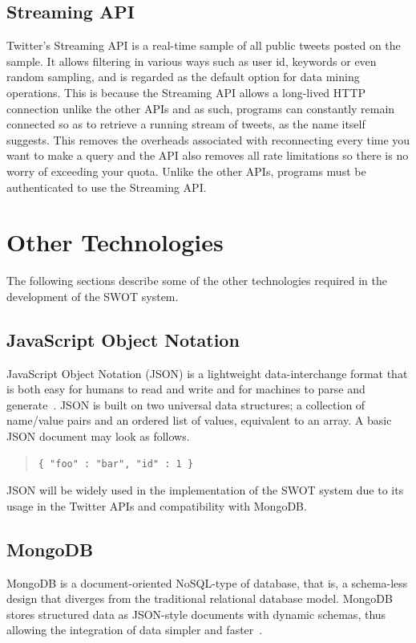 \subsection{Streaming API}
Twitter's Streaming API is a real-time sample of all public tweets posted on the sample. It allows filtering in various ways such as user id, keywords or even random sampling, and is regarded as the default option for data mining operations. This is because the Streaming API allows a long-lived HTTP connection unlike the other APIs and as such, programs can constantly remain connected so as to retrieve a running stream of tweets, as the name itself suggests. This removes the overheads associated with reconnecting every time you want to make a query and the API also removes all rate limitations so there is no worry of exceeding your quota. Unlike the other APIs, programs must be authenticated to use the Streaming API.

\section{Other Technologies}
The following sections describe some of the other technologies required in the development of the SWOT system.

\subsection{JavaScript Object Notation}
JavaScript Object Notation (JSON) is a lightweight data-interchange format that is both easy for humans to read and write and for machines to parse and generate~\cite{json}. JSON is built on two universal data structures; a collection of name/value pairs and an ordered list of values, equivalent to an array. A basic JSON document may look as follows.

\begin{quote}
\begin{verbatim}
{ "foo" : "bar", "id" : 1 }
\end{verbatim}
\end{quote}

JSON will be widely used in the implementation of the SWOT system due to its usage in the Twitter APIs and compatibility with MongoDB. 

\subsection{MongoDB}
MongoDB is a document-oriented NoSQL-type of database, that is, a schema-less design that diverges from the traditional relational database model. MongoDB stores structured data as JSON-style documents with dynamic schemas, thus allowing the integration of data simpler and faster~\cite{mongodb}.

